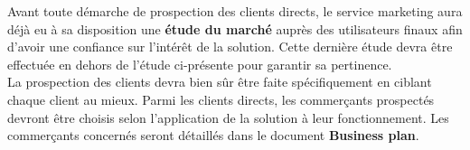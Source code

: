 Avant toute démarche de prospection des clients directs, le service marketing
aura déjà eu à sa disposition une \textbf{étude du marché} auprès des
utilisateurs finaux afin d'avoir une confiance sur l'intérêt de la solution.
Cette dernière étude devra être effectuée en dehors de l'étude ci-présente pour
garantir sa pertinence. \\

La prospection des clients devra bien sûr être faite spécifiquement en ciblant
chaque client au mieux. Parmi les clients directs, les commerçants prospectés
devront être choisis selon l'application de la solution à leur fonctionnement.
Les commerçants concernés seront détaillés dans le document \textbf{Business
plan}.


